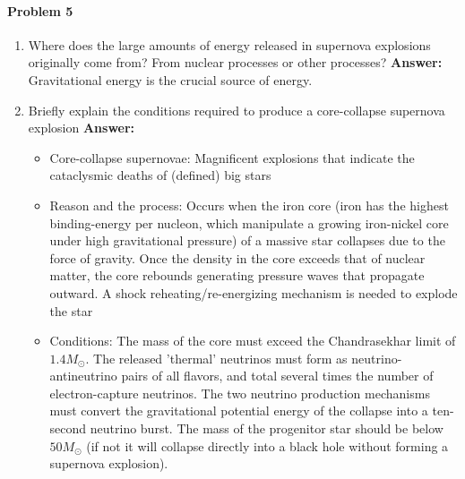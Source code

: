 \documentclass[11pt]{scrartcl}
\begin{document}
{\newpage
\paragraph*{Problem 5}
\begin{enumerate}[label=(\alph*)]
\item Where does the large amounts of energy released in supernova explosions originally come from? From nuclear processes or other processes?
\newline \textbf{Answer: }
\newline Gravitational energy is the crucial source of energy.
\item Briefly explain the conditions required to produce a core-collapse supernova explosion
\newline \textbf{Answer: }
\begin{itemize}[noitemsep,nolistsep]
    \item Core-collapse supernovae: Magnificent explosions that indicate the cataclysmic deaths of (defined) big stars 
    \item Reason and the process: Occurs when the iron core (iron has the highest binding-energy per nucleon, which manipulate a growing iron-nickel core under high gravitational pressure) of a massive star collapses due to the force of gravity. Once the density in the core exceeds that of nuclear matter, the core rebounds generating pressure waves that propagate outward. A shock reheating/re-energizing mechanism is needed to explode the star
    \item Conditions: The mass of the core must exceed the Chandrasekhar limit of $1.4M_\odot$. The released 'thermal' neutrinos must form as neutrino-antineutrino pairs of all flavors, and total several times the number of electron-capture neutrinos. The two neutrino production mechanisms must convert the gravitational potential energy of the collapse into a ten-second neutrino burst. The mass of the progenitor star should be below $50M_\odot$ (if not it will collapse directly into a black hole without forming a supernova explosion).
\end{itemize}
\end{enumerate}

}
\end{document}
